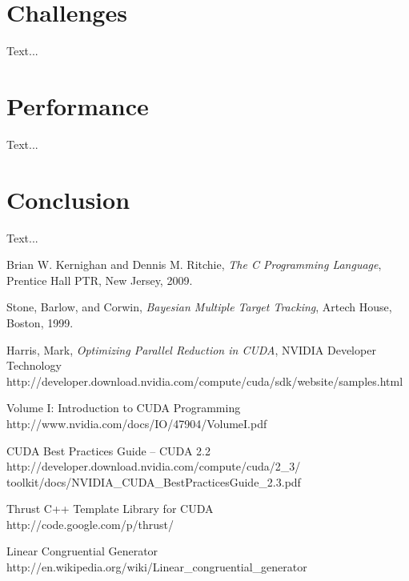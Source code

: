 \documentclass{article}
\begin{document}
\section{Challenges}
Text...

\section{Performance}
Text...

\section{Conclusion}
Text...

\begin{thebibliography}{9}

  Brian W. Kernighan and Dennis M. Ritchie,
  \emph{The C Programming Language},
  Prentice Hall PTR, New Jersey,
  2009.

  Stone, Barlow, and Corwin,
  \emph{Bayesian Multiple Target Tracking},
  Artech House, Boston,
  1999.

   Harris, Mark,
   \emph{Optimizing Parallel Reduction in CUDA},
   NVIDIA Developer Technology \\
   http://developer.download.nvidia.com/compute/cuda/sdk/website/samples.html

   Volume I: Introduction to CUDA Programming \\
   http://www.nvidia.com/docs/IO/47904/VolumeI.pdf

   CUDA Best Practices Guide -- CUDA 2.2\\
   http://developer.download.nvidia.com/compute/cuda/2\_3/\\
   toolkit/docs/NVIDIA\_CUDA\_BestPracticesGuide\_2.3.pdf

   Thrust C++ Template Library for CUDA \\
   http://code.google.com/p/thrust/

   Linear Congruential Generator \\
   http://en.wikipedia.org/wiki/Linear\_congruential\_generator

\end{thebibliography}
\end{document}
